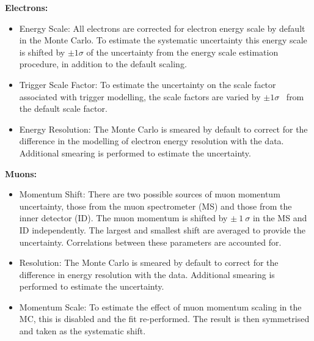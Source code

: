 \vspace{5mm}
\noindent
\textbf{Electrons:}
\begin{itemize}
    \item Energy Scale: All electrons are corrected for electron energy scale by default in the Monte Carlo. To estimate the systematic uncertainty this energy scale is shifted by $\pm 1\sigma$ of the uncertainty from the energy scale estimation procedure, in addition to the default scaling. 
    \item Trigger Scale Factor: To estimate the uncertainty on the scale factor associated with trigger modelling, the scale factors are varied by $\pm 1\sigma$~ from the default scale factor.
    \item Energy Resolution: The Monte Carlo is smeared by default to correct for the difference in the modelling of electron energy resolution with the data. Additional smearing is performed to estimate the uncertainty.
\end{itemize}

\vspace{5mm}
\noindent
\textbf{Muons:}
\begin{itemize}
    \item Momentum Shift: There are two possible sources of muon momentum uncertainty, those from the muon spectrometer (MS) and those from the inner detector (ID). The muon momentum is shifted by $\pm~1~\sigma$ in the MS and ID independently. The largest and smallest shift are averaged to provide the uncertainty. Correlations between these parameters are accounted for.
    \item Resolution: The Monte Carlo is smeared by default to correct for the difference in energy resolution with the data. Additional smearing is performed to estimate the uncertainty.
    \item Momentum Scale: To estimate the effect of muon momentum scaling in the MC, this is disabled and the fit re-performed. The result is then symmetrised and taken as the systematic shift.
\end{itemize}

